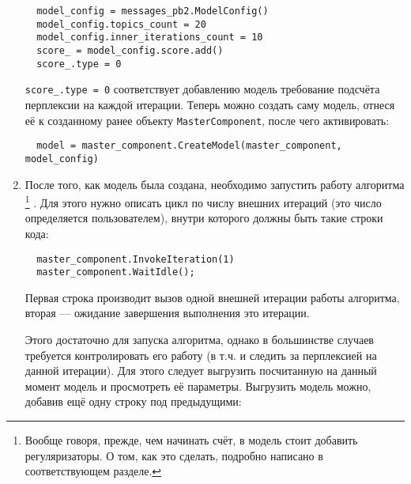 \begin{enumerate}
	\vspace{5pt}
	
	\verb|  model_config = messages_pb2.ModelConfig()| \\
	\verb|  model_config.topics_count = 20| \\
	\verb|  model_config.inner_iterations_count = 10| \\	
	\verb|  score_ = model_config.score.add()| \\
	\verb|  score_.type = 0|
	        
	\vspace{5pt}
	
	\verb|score_.type = 0| соответствует добавлению модель требование подсчёта перплексии на каждой итерации. Теперь можно создать саму модель, отнеся её к созданному ранее объекту \verb|MasterComponent|, после чего активировать:
	
	\vspace{5pt}
	
	\verb|	model = master_component.CreateModel(master_component, model_config)| \\
	
	\vspace{5pt}
	
	\item 
	\label{step_2}
	После того, как модель была создана, необходимо запустить работу алгоритма
	\footnote{Вообще говоря, прежде, чем начинать счёт, в модель стоит добавить регуляризаторы. О том, как это сделать, подробно написано в соответствующем разделе.}
	. Для этого нужно описать цикл по числу внешних итераций (это число определяется пользователем), внутри которого должны быть такие строки кода:
	
	\vspace{5pt}
	
	\verb|  master_component.InvokeIteration(1)| \\
	\verb|  master_component.WaitIdle();|
	        
	\vspace{5pt}	
	
	Первая строка производит вызов одной внешней итерации работы алгоритма, вторая --- ожидание завершения выполнения это итерации.
	
	Этого достаточно для запуска алгоритма, однако в большинстве случаев требуется контролировать его работу (в т.ч. и следить за перплексией на данной итерации). Для этого следует выгрузить посчитанную на данный момент модель и просмотреть её параметры. Выгрузить модель можно, добавив ещё одну строку под предыдущими:
	

\end{enumerate}
